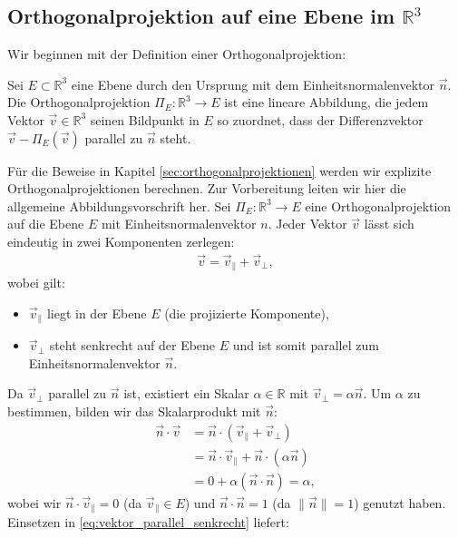 
\subsection{Orthogonalprojektion auf eine Ebene im \texorpdfstring{$\mathbb{R}^3$}{R³}}

Wir beginnen mit der Definition einer Orthogonalprojektion:

\begin{definition} \label{def:orthogonalprojektion}
Sei $E \subset \mathbb{R}^3$ eine Ebene durch den Ursprung mit dem Einheitsnormalenvektor $\vec{n}$. Die Orthogonalprojektion $\Pi_E: \mathbb{R}^3 \rightarrow E$ ist eine lineare Abbildung, die jedem Vektor $\vec{v} \in \mathbb{R}^3$ seinen Bildpunkt in $E$ so zuordnet, dass der Differenzvektor $\vec{v} - \Pi_E(\vec{v})$ parallel zu $\vec{n}$ steht.
\end{definition}

Für die Beweise in Kapitel \ref{sec:orthogonalprojektionen} werden wir explizite Orthogonalprojektionen berechnen. Zur Vorbereitung leiten wir hier die allgemeine Abbildungsvorschrift her. Sei $\Pi_E: \mathbb{R}^3 \rightarrow E$ eine Orthogonalprojektion auf die Ebene $E$ mit Einheitsnormalenvektor $n$. Jeder Vektor $\vec{v}$ lässt sich eindeutig in zwei Komponenten zerlegen:
\begin{align} \label{eq:vektor_parallel_senkrecht}
    \vec{v} = \vec{v}_{\parallel} + \vec{v}_{\perp},
\end{align}
wobei gilt:
\begin{itemize}
    \item $\vec{v}_{\parallel}$ liegt in der Ebene $E$ (die projizierte Komponente),
    \item $\vec{v}_{\perp}$ steht senkrecht auf der Ebene $E$ und ist somit parallel zum Einheitsnormalenvektor $\vec{n}$.
\end{itemize}

Da $\vec{v}_{\perp}$ parallel zu $\vec{n}$ ist, existiert ein Skalar $\alpha \in \mathbb{R}$ mit $\vec{v}_{\perp} = \alpha \vec{n}$. Um $\alpha$ zu bestimmen, bilden wir das Skalarprodukt mit $\vec{n}$:
\begin{align} \label{eq:skalar_senkrecht}
    \vec{n} \cdot \vec{v} &= \vec{n} \cdot (\vec{v}_{\parallel} + \vec{v}_{\perp}) \nonumber \\
    &= \vec{n} \cdot \vec{v}_{\parallel} + \vec{n} \cdot (\alpha \vec{n}) \nonumber \\
    &= 0 + \alpha (\vec{n} \cdot \vec{n}) = \alpha,
\end{align}
wobei wir $\vec{n} \cdot \vec{v}_{\parallel} = 0$ (da $\vec{v}_{\parallel} \in E$) und $\vec{n} \cdot \vec{n} = 1$ (da $\|\vec{n}\|=1$) genutzt haben. Einsetzen in \eqref{eq:vektor_parallel_senkrecht} liefert:

